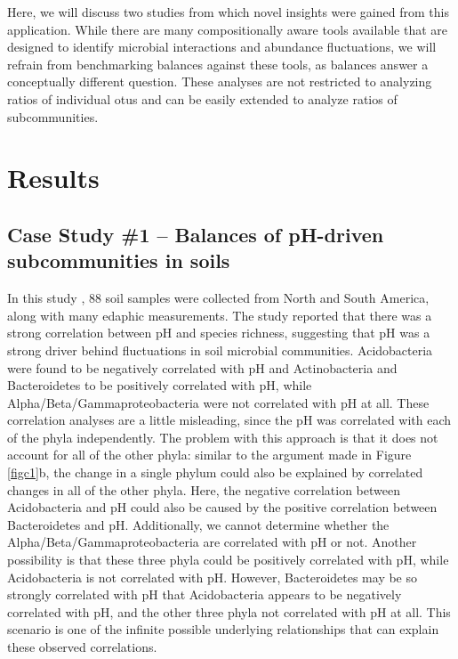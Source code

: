  Here, we will discuss two studies from which novel insights were gained from this application.  While there are many compositionally aware tools available that are designed to identify microbial interactions and abundance fluctuations, we will refrain from benchmarking balances against these tools, as balances answer a conceptually different question.  These analyses are not restricted to analyzing ratios of individual \gls{otu}s and can be easily extended to analyze ratios of subcommunities.  \par
\section{ Results}
 \subsection{Case Study \#1 – Balances of pH-driven subcommunities in soils}
 In this study \cite{soil_pyro}, 88 soil samples were collected from North and South America, along with many edaphic measurements.  The study reported that there was a strong correlation between pH and species richness, suggesting that pH was a strong driver behind fluctuations in soil microbial communities. Acidobacteria were found to be negatively correlated with pH and Actinobacteria and Bacteroidetes to be positively correlated with pH, while Alpha/Beta/Gammaproteobacteria were not correlated with pH at all.  These correlation analyses are a little misleading, since the pH was correlated with each of the phyla independently.  The problem with this approach is that it does not account for all of the other phyla: similar to the argument made in Figure \ref{figc1}b, the change in a single phylum could also be explained by correlated changes in all of the other phyla.  Here, the negative correlation between Acidobacteria and pH could also be caused by the positive correlation between Bacteroidetes and pH.  Additionally, we cannot determine whether the Alpha/Beta/Gammaproteobacteria are correlated with pH or not.  Another possibility is that these three phyla could be positively correlated with pH, while Acidobacteria is not correlated with pH.  However, Bacteroidetes may be so strongly correlated with pH that Acidobacteria appears to be negatively correlated with pH, and the other three phyla not correlated with pH at all.  This scenario is one of the infinite possible underlying relationships that can explain these observed correlations. \par
